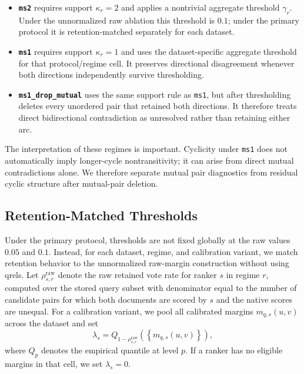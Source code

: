 \documentclass[manuscript,anonymous,review]{acmart}
\begin{document}
\begin{itemize}
  \item \textbf{\texttt{ms2}} requires support $\kappa_r=2$ and applies a
    nontrivial aggregate threshold $\gamma_r$. Under the unnormalized raw
    ablation this threshold is $0.1$; under the primary protocol it is
    retention-matched separately for each dataset.
  \item \textbf{\texttt{ms1}} requires support $\kappa_r=1$ and uses the
    dataset-specific aggregate threshold for that protocol/regime cell. It
    preserves directional disagreement whenever both directions independently
    survive thresholding.
  \item \textbf{\texttt{ms1\_drop\_mutual}} uses the same support rule as
    \texttt{ms1}, but after thresholding deletes every unordered pair that
    retained both directions. It therefore treats direct bidirectional
    contradiction as unresolved rather than retaining either arc.
\end{itemize}

The interpretation of these regimes is important. Cyclicity under
\texttt{ms1} does not automatically imply longer-cycle nontransitivity; it can
arise from direct mutual contradictions alone. We therefore separate mutual
pair diagnostics from residual cyclic structure after mutual-pair deletion.

\subsection{Retention-Matched Thresholds}

Under the primary protocol, thresholds are not fixed globally at the raw
values $0.05$ and $0.1$. Instead, for each dataset, regime, and calibration
variant, we match retention behavior to the unnormalized raw-margin construction
without using qrels. Let $\rho^{\mathrm{raw}}_{s,r}$ denote the raw retained
vote rate for ranker $s$ in regime $r$, computed over the stored query subset
with denominator equal to the number of candidate pairs for which both
documents are scored by $s$ and the native scores are unequal. For a
calibration variant, we pool all calibrated margins
$m_{q,s}(u,v)$ across the dataset and set
\begin{equation}
  \lambda_s = Q_{1-\rho^{\mathrm{raw}}_{s,r}}
  \left(\left\{m_{q,s}(u,v)\right\}\right),
  \label{eq:vote-threshold-match}
\end{equation}
where $Q_p$ denotes the empirical quantile at level $p$. If a ranker has no
eligible margins in that cell, we set $\lambda_s=0$.
\end{document}
